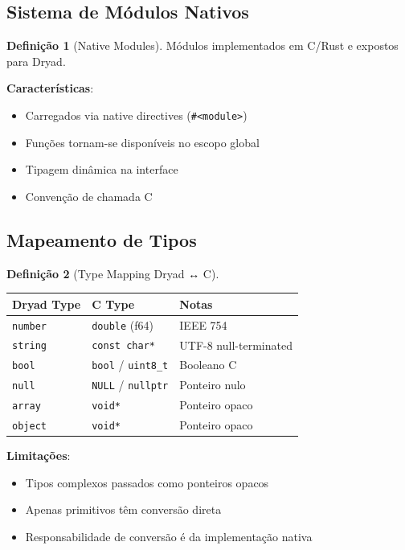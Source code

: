 \documentclass[12pt,a4paper]{article}
\theoremstyle{definition}
\newtheorem{definition}{Definição}[section]
\begin{document}
\subsection{Sistema de Módulos Nativos}

\begin{definition}[Native Modules]
Módulos implementados em C/Rust e expostos para Dryad.

\textbf{Características}:
\begin{itemize}
    \item Carregados via native directives (\texttt{\#<module>})
    \item Funções tornam-se disponíveis no escopo global
    \item Tipagem dinâmica na interface
    \item Convenção de chamada C
\end{itemize}
\end{definition}

\subsection{Mapeamento de Tipos}

\begin{definition}[Type Mapping Dryad ↔ C]
\begin{center}
\begin{tabular}{|l|l|l|}
\hline
\textbf{Dryad Type} & \textbf{C Type} & \textbf{Notas} \\
\hline
\texttt{number} & \texttt{double} (f64) & IEEE 754 \\
\texttt{string} & \texttt{const char*} & UTF-8 null-terminated \\
\texttt{bool} & \texttt{bool} / \texttt{uint8\_t} & Booleano C \\
\texttt{null} & \texttt{NULL} / \texttt{nullptr} & Ponteiro nulo \\
\texttt{array} & \texttt{void*} & Ponteiro opaco \\
\texttt{object} & \texttt{void*} & Ponteiro opaco \\
\hline
\end{tabular}
\end{center}

\textbf{Limitações}:
\begin{itemize}
    \item Tipos complexos passados como ponteiros opacos
    \item Apenas primitivos têm conversão direta
    \item Responsabilidade de conversão é da implementação nativa
\end{itemize}
\end{definition}
\end{document}
